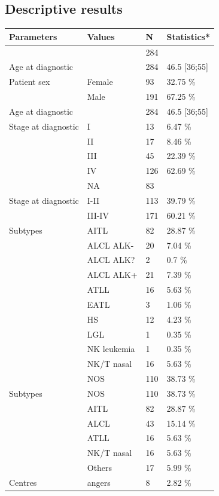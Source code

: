 \documentclass[a4paper,11pt] {article}
\begin{document}
\subsection{Descriptive results}
\begin{longtable}{llll}
  \hline
Parameters & Values & N & Statistics* \\ 
  \hline
 &  & 284 &  \\ 
  Age at diagnostic &  & 284 & 46.5 [36;55] \\ 
  Patient sex & Female & 93 & 32.75 \% \\ 
   & Male & 191 & 67.25 \% \\ 
  Age at diagnostic &  & 284 & 46.5 [36;55] \\ 
  Stage at diagnostic & I & 13 & 6.47 \% \\ 
   & II & 17 & 8.46 \% \\ 
   & III & 45 & 22.39 \% \\ 
   & IV & 126 & 62.69 \% \\ 
   & NA & 83 &  \\ 
  Stage at diagnostic & I-II & 113 & 39.79 \% \\ 
   & III-IV & 171 & 60.21 \% \\ 
  Subtypes & AITL & 82 & 28.87 \% \\ 
   & ALCL ALK- & 20 & 7.04 \% \\ 
   & ALCL ALK? & 2 & 0.7 \% \\ 
   & ALCL ALK+ & 21 & 7.39 \% \\ 
   & ATLL & 16 & 5.63 \% \\ 
   & EATL & 3 & 1.06 \% \\ 
   & HS & 12 & 4.23 \% \\ 
   & LGL & 1 & 0.35 \% \\ 
   & NK leukemia & 1 & 0.35 \% \\ 
   & NK/T nasal & 16 & 5.63 \% \\ 
   & NOS & 110 & 38.73 \% \\ 
  Subtypes & NOS & 110 & 38.73 \% \\ 
   & AITL & 82 & 28.87 \% \\ 
   & ALCL & 43 & 15.14 \% \\ 
   & ATLL & 16 & 5.63 \% \\ 
   & NK/T nasal & 16 & 5.63 \% \\ 
   & Others & 17 & 5.99 \% \\ 
  Centres & angers & 8 & 2.82 \% \\ 

\end{longtable}
\end{document}
